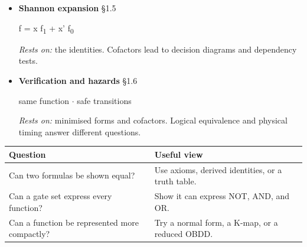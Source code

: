 \documentclass[11pt]{article}
\begin{document}
\begin{keepsection}
\begin{itemize}
duality \ensuremath{\cdot} De Morgan \ensuremath{\cdot} absorption

\emph{Rests on:} the axioms. Derived laws shorten proofs and expressions.

\item 
{}
\textbf{Shannon expansion} \hfill{\small\color{FAUblue}§1.5}

f = x f\textsubscript{1} + x' f\textsubscript{0}

\emph{Rests on:} the identities. Cofactors lead to decision diagrams and dependency tests.

\item 
{}
\textbf{Verification and hazards} \hfill{\small\color{FAUblue}§1.6}

same function \ensuremath{\cdot} safe transitions

\emph{Rests on:} minimised forms and cofactors. Logical equivalence and physical timing answer different questions.

\end{itemize}

\begin{center}\small\begin{tabularx}{\linewidth}{>{\raggedright\arraybackslash}X>{\raggedright\arraybackslash}X}\toprule
\textbf{Question} & \textbf{Useful view} \\ \midrule
Can two formulas be shown equal? & Use axioms, derived identities, or a truth table. \\
Can a gate set express every function? & Show it can express NOT, AND, and OR. \\
Can a function be represented more compactly? & Try a normal form, a K-map, or a reduced OBDD. \\
\bottomrule\end{tabularx}\end{center}
\end{keepsection}
\end{document}
